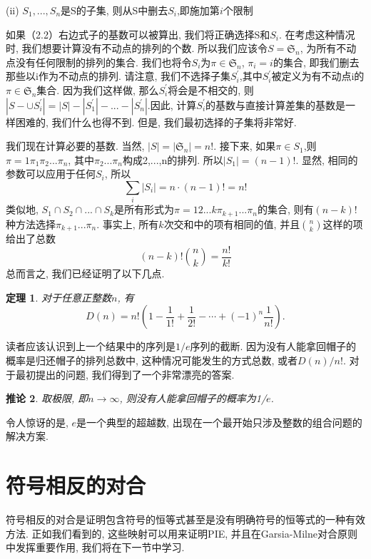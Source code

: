 \documentclass{ctexbook}
\newtheorem{thm}{定理}[section]
\newtheorem{cor}[thm]{推论}
\begin{document}
	(ii) $S_{1},...,S_{n}$是S的子集, 则从S中删去$S_{i}$,即施加第$i$个限制

	\noindent 如果（2.2）右边式子的基数可以被算出, 我们将正确选择S和$S_{i}$. 在考虑这种情况时, 我们想要计算没有不动点的排列的个数. 所以我们应该令$S=\mathfrak{S}_{n}$, 为所有不动点没有任何限制的排列的集合. 我们也将令$S_{i}$为$\pi \in \mathfrak{S}_{n}$, $\pi_{i} =i$的集合, 即我们删去那些以i作为不动点的排列. 请注意, 我们不选择子集$S_{i}^{\prime}$,其中$S_{i}^{\prime}$被定义为有不动点i的$\pi \in \mathfrak{S}_{n}$集合. 因为我们这样做, 那么$S_{i}^{\prime}$将会是不相交的, 则$|S-\cup S_{i}^{\prime}|=|S|-|S_{1}^{\prime}|-...-|S_{n}^{\prime}|$.因此, 计算$S_{i}^{\prime}$的基数与直接计算差集的基数是一样困难的, 我们什么也得不到. 但是, 我们最初选择的子集将非常好.

	我们现在计算必要的基数. 当然, $|S|=|\mathfrak{S}_{n}|=n!$. 接下来, 如果$\pi\in S_{1}$,则$\pi =1\pi_{1} \pi_{2} ... \pi_{n}$, 其中$\pi_{2} ... \pi_{n}$构成2,...,n的排列. 所以$|S_{1}|=(n-1)\text{!}$. 显然, 相同的参数可以应用于任何$S_{i}$, 所以
\[
	\sum_{i}\left|S_{i}\right|=n\cdot (n-1)!=n!
\]
	类似地, $S_{1}\cap S_{2}\cap ...\cap S_{k}$是所有形式为$\pi =12...k\pi_{k+1}...\pi_{n}$的集合, 则有$(n-k)!$种方法选择$\pi_{k+1}...\pi_{n}$. 事实上, 所有$k$次交和中的项有相同的值, 并且$\binom{n}{k}$这样的项给出了总数
\[
	(n-k)!\binom{n}{k}=\frac{n!}{k!}
\]
	总而言之, 我们已经证明了以下几点.
\begin{thm}
	对于任意正整数$n$, 有
	\[
	D(n)=n!\left(1-\frac{1}{1!}+\frac{1}{2!}-\cdots+(-1)^{n}\frac{1}{n!}\right).
	\]
\end{thm}

	读者应该认识到上一个结果中的序列是$1/\mathit{e}$序列的截断. 因为没有人能拿回帽子的概率是归还帽子的排列总数中, 这种情况可能发生的方式总数, 或者$D(n)/n!$. 对于最初提出的问题, 我们得到了一个非常漂亮的答案.
\begin{cor}
	取极限, 即$n\rightarrow \infty$, 则没有人能拿回帽子的概率为1/$\mathit{e}$.
\end{cor}
	
	令人惊讶的是, $\mathit{e}$是一个典型的超越数, 出现在一个最开始只涉及整数的组合问题的解决方案.

\section{符号相反的对合}
	符号相反的对合是证明包含符号的恒等式甚至是没有明确符号的恒等式的一种有效方法. 正如我们看到的, 这些映射可以用来证明PIE, 并且在Garsia-Milne对合原则中发挥重要作用, 我们将在下一节中学习.
\end{document}
